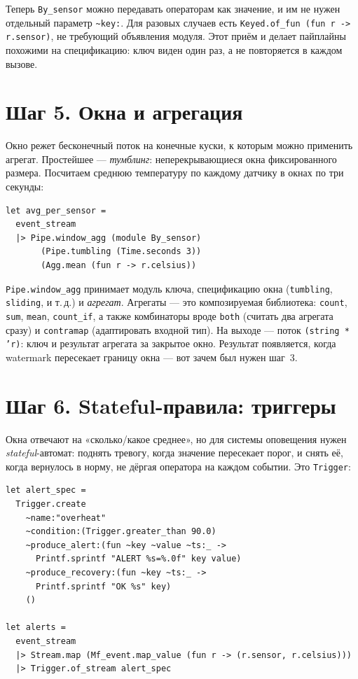 \documentclass[11pt,a4paper]{article}
\begin{document}
Теперь \texttt{By\_sensor} можно передавать операторам как значение, и
им не нужен отдельный параметр \texttt{\textasciitilde{}key:}. Для
разовых случаев есть \texttt{Keyed.of\_fun (fun r -> r.sensor)}, не
требующий объявления модуля. Этот приём и делает пайплайны похожими на
спецификацию: ключ виден один раз, а не повторяется в каждом вызове.

\section{Шаг 5. Окна и агрегация}

Окно режет бесконечный поток на конечные куски, к которым можно
применить агрегат. Простейшее --- \emph{тумблинг}: неперекрывающиеся
окна фиксированного размера. Посчитаем среднюю температуру по каждому
датчику в окнах по три секунды:

\begin{lstlisting}
let avg_per_sensor =
  event_stream
  |> Pipe.window_agg (module By_sensor)
       (Pipe.tumbling (Time.seconds 3))
       (Agg.mean (fun r -> r.celsius))
\end{lstlisting}

\texttt{Pipe.window\_agg} принимает модуль ключа, спецификацию окна
(\texttt{tumbling}, \texttt{sliding}, и т.\,д.) и \emph{агрегат}.
Агрегаты --- это композируемая библиотека: \texttt{count},
\texttt{sum}, \texttt{mean}, \texttt{count\_if}, а также комбинаторы
вроде \texttt{both} (считать два агрегата сразу) и \texttt{contramap}
(адаптировать входной тип). На выходе --- поток
\texttt{(string * 'r)}: ключ и результат агрегата за закрытое окно.
Результат появляется, когда watermark пересекает границу окна --- вот
зачем был нужен шаг~3.

\section{Шаг 6. Stateful-правила: триггеры}

Окна отвечают на «сколько/какое среднее», но для системы оповещения
нужен \emph{stateful}-автомат: поднять тревогу, когда значение
пересекает порог, и снять её, когда вернулось в норму, не дёргая
оператора на каждом событии. Это \texttt{Trigger}:

\begin{lstlisting}
let alert_spec =
  Trigger.create
    ~name:"overheat"
    ~condition:(Trigger.greater_than 90.0)
    ~produce_alert:(fun ~key ~value ~ts:_ ->
      Printf.sprintf "ALERT %s=%.0f" key value)
    ~produce_recovery:(fun ~key ~ts:_ ->
      Printf.sprintf "OK %s" key)
    ()

let alerts =
  event_stream
  |> Stream.map (Mf_event.map_value (fun r -> (r.sensor, r.celsius)))
  |> Trigger.of_stream alert_spec
\end{lstlisting}
\end{document}
